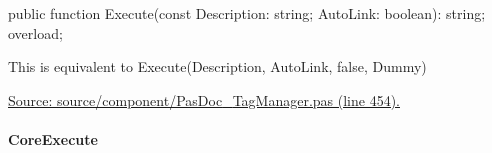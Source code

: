 \documentclass{report}
\newif\ifpdf
\begin{document}
\label{PasDoc_TagManager.TTagManager-Execute}
\begin{list}{}{
\setlength{\itemindent}{0cm}
\setlength{\listparindent}{0cm}
\setlength{\leftmargin}{\evensidemargin}
\addtolength{\leftmargin}{\tmplength}
\settowidth{\labelsep}{X}
\addtolength{\leftmargin}{\labelsep}
\setlength{\labelwidth}{\tmplength}
}
\item[\textbf{Declaration}\hfill]
\ifpdf
\begin{flushleft}
\fi
\begin{ttfamily}
public function Execute(const Description: string; AutoLink: boolean): string; overload;\end{ttfamily}

\ifpdf
\end{flushleft}
\fi

\par
\item[\textbf{Description}]
This is equivalent to Execute(Description, AutoLink, false, Dummy)\par
\href{https://github.com/pasdoc/pasdoc/blob/master/source/component/PasDoc_TagManager.pas#L454}{Source: source/component/PasDoc{\_}TagManager.pas (line 454).}

\end{list}
\paragraph*{CoreExecute}\hspace*{\fill}
\end{document}
